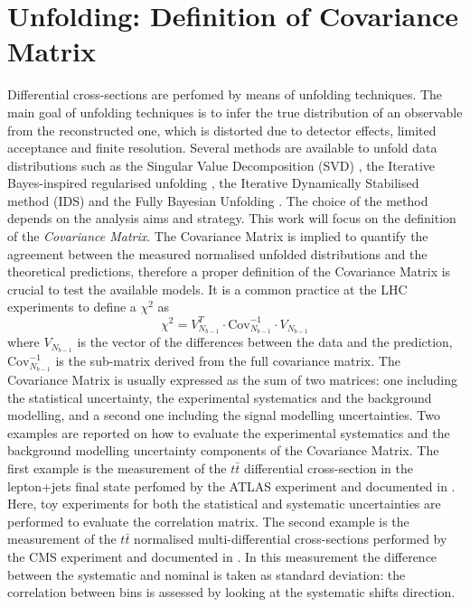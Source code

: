 \documentclass[12pt]{article}
\begin{document}
\section{Unfolding: Definition of Covariance Matrix}
Differential cross-sections are perfomed by means of unfolding techniques. The main goal of unfolding techniques is to infer the true distribution of an observable from the reconstructed one, which is distorted due to detector effects, limited acceptance and finite resolution. 
Several methods are available to unfold data distributions such as the Singular Value Decomposition (SVD) \cite{H_cker_1996}, the Iterative Bayes-inspired regularised unfolding \cite{DAGOSTINI1995487}, the Iterative Dynamically Stabilised method (IDS) \cite{malaescu2009iterative} and the Fully Bayesian Unfolding \cite{choudalakis2012fully}. The choice of the method depends on the analysis aims and strategy. 
This work will focus on the definition of the \emph{Covariance Matrix}. The Covariance Matrix is implied to quantify the agreement between the measured normalised unfolded distributions and the theoretical predictions, therefore a proper definition of the Covariance Matrix is crucial to test the available models. It is a common practice at the LHC experiments to define a $\chi^2$ as
\begin{equation}
\chi^2 = V^T_{N_{b-1}}\cdot\mathrm{Cov}^{-1}_{N_{b-1}}\cdot V_{N_{b-1}}
\end{equation}
where $V_{N_{b-1}}$ is the vector of the differences between the data and the prediction, $\mathrm{Cov}^{-1}_{N_{b-1}}$ is the sub-matrix derived from the full covariance matrix.
The Covariance Matrix is usually expressed as the sum of two matrices: one including the statistical uncertainty, the experimental systematics and the background modelling, and a second one including the signal modelling uncertainties. 
Two examples are reported on how to evaluate the experimental systematics and the background modelling uncertainty components of the Covariance Matrix.
The first example is the measurement of the $t\bar{t}$ differential cross-section in the lepton+jets final state perfomed by the ATLAS experiment and documented in \cite{atlas_diffrential}. Here, toy experiments for both the statistical and systematic uncertainties are performed to evaluate the correlation matrix.
The second example is the measurement of the $t\bar{t}$ normalised multi-differential cross-sections performed by the CMS experiment and documented in \cite{Sirunyan_2020}. In this measurement the difference between the systematic and nominal is taken as standard deviation: the correlation between bins is assessed by looking at the systematic shifts direction.
\end{document}
